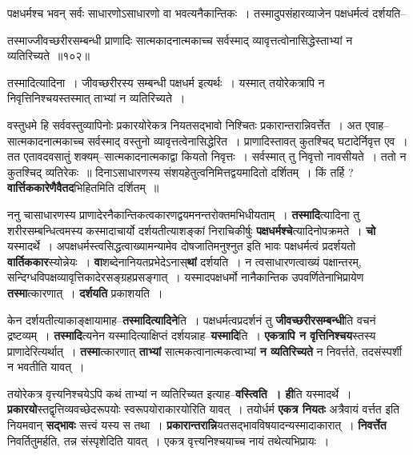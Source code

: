 \documentclass[article,12pt,a4paper]{memoir}
\begin{document}
	पक्षधर्मश्च भवन् सर्वः साधारणोऽसाधारणो वा भवत्यनैकान्तिकः । तस्मादुपसंहारव्याजेन पक्षधर्मत्वं दर्शयति--  
	  
	तस्माज्जीवच्छरीरसम्बन्धी प्राणादिः सात्मकादनात्मकाच्च सर्वस्माद् व्यावृत्तत्वोनासिद्धेस्ताभ्यां न व्यतिरिच्यते ॥१०२॥ 
	  
	तस्मादित्यादिना । जीवच्छरीरस्य सम्बन्धी पक्षधर्म इत्यर्थः । यस्मात् तयोरेकत्रापि न निवृत्तिनिश्चयस्तस्मात् ताभ्यां न व्यतिरिच्यते ।  
	  
	वस्तुधमे हि सर्ववस्तुव्यापिनोः प्रकारयोरेकत्र नियतसद्भावो निश्चितः प्रकारान्तरान्निवर्त्तेत । अत एवाह--सात्मकादनात्मकाच्च सर्वस्माद् वस्तुनो व्यावृत्तत्वेनासिद्धेरित । प्राणादिस्तावत् कुतश्चिद् घटादेर्निवृत्त एव । तत एतावदवसातुं शक्यम्--सात्मकादनात्मकाद्वा कियतो निवृत्तः । सर्वस्मात् तु निवृत्तो नावसीयते । ततो न कुतश्चिद् व्यतिरेकः ॥ दिनाऽसाधारणस्य संशयहेतुत्वनिमित्तद्वयमादितो दर्शितम् । किं तर्हि ? \textbf{वार्त्तिककारेणैवैतद}भिहितमिति दर्शितम् ॥
	\pend
      

	  \pstart ननु चासाधारणस्य प्राणादेरनैकान्तिकत्वकारणद्वयमनन्तरोक्तमभिधीयताम् । \textbf{तस्मादि}त्यादिना तु शरीरसम्बन्धित्वमस्य कस्मादाचार्यो दर्शयतीत्याशङ्कां निराचिकीर्षुः \textbf{पक्षधर्मश्चे}त्यादिनोपक्रमते । \textbf{चो} यस्मादर्थे । अपक्षधर्मस्त्वसिद्धत्वाख्यामन्यामेव दोषजातिमनुश्नुत इति भावः पक्षधर्मत्वं प्रदर्शयतो \textbf{वार्तिककार}स्योन्नेयः । \textbf{वा}शब्देनानियतप्रभेदेऽनास्\textbf{थां} दर्शयति । न त्वसाधारणत्वाख्यं पक्षान्तरम्, सन्दिग्धविपक्षव्यावृत्तिकादेरसङ्ग्रहप्रसङ्गात् । यस्मादपक्षधर्मो नानैकान्तिक उपवर्णितेनाभिप्रायेण \textbf{तस्मा}त्कारणात् । \textbf{दर्शयति} प्रकाशयति ।
	\pend
      

	  \pstart केन दर्शयतीत्याकाङ्क्षायामाह--\textbf{तस्मादित्यादिने}ति । पक्षधर्मत्वप्रदर्शनं तु \textbf{जीवच्छरीरसम्बन्धी}ति वचनं द्रष्टव्यम् । \textbf{तस्मादि}त्यनेन यस्मादित्याक्षिप्तं दर्शयन्नाह--\textbf{यस्मादि}ति । \textbf{एकत्रापि न वृत्तिनिश्चय}स्तस्य प्राणादेरित्यर्थात् । \textbf{तस्मा}त्कारणात् \textbf{ताभ्यां} सात्मकत्वानात्मकत्वाभ्यां \textbf{न व्यतिरिच्यते} न निवर्त्तते, तदसंस्पर्शी न भवतीति यावत् ।
	\pend
      

	  \pstart तयोरेकत्र वृत्त्यनिश्चयेऽपि कथं ताभ्यां न व्यतिरिच्यत इत्याह--\textbf{वस्त्विति । ही}ति यस्मादर्थे । \textbf{प्रकारयो}स्तद्वृत्तिव्यवच्छेदरूपयोः स्वरूपयोराकारयोरिति यावत् । तयोर्धर्म \textbf{एकत्र नियतः} अत्रैवायं वर्त्तत इति नियमवान् \textbf{सद्भावः} सत्त्वं यस्य स तथा । \textbf{प्रकारान्तरान्नि}यतसद्भावविषयादन्यस्मादाकारात् । \textbf{निवर्त्तेत} निवर्तितुमर्हति, तन्न संस्पृशेदिति यावत् । एकत्र वृत्त्यनिश्चयाच्च नायं तथेत्यभिप्रायः ।
	\pend
      
\end{document}
